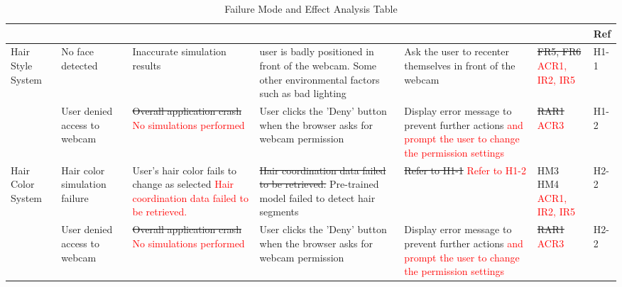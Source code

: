\documentclass{article}
\begin{document}
\begin{landscape}
\begin{table}[h!]
\def\arraystretch{1.7}
\begin{tabularx}{1.2\textwidth} { |X|X|X|X|X
  | p{0.9cm}
  | p{0.9cm} | }
\hline
	\centering{Component} & \centering{Failure Mode} & \centering{Effects of Failure} & \centering{Causes of Failure} & \centering{Recommended Action} & \centering{SR} & Ref \\ \hline
    Hair Style System & No face detected & Inaccurate simulation results & user is badly positioned in front of the webcam. Some other environmental factors such as bad lighting & Ask the user to recenter themselves in front of the webcam & \sout{FR5, FR6} \textcolor{red}{ACR1, IR2, IR5} & H1-1 \\ \cline{2-7}
     & User denied access to webcam & \sout{Overall application crash} \textcolor{red}{No simulations performed} & User clicks the 'Deny' button when the browser asks for webcam permission & Display error message to prevent further actions \textcolor{red}{and prompt the user to change the permission settings} & \sout{RAR1} \textcolor{red}{ACR3} & H1-2 \\ \hline
     
     Hair Color System  & Hair color simulation failure & User's hair color fails to change as selected 
     \newline \textcolor{red}{Hair coordination data failed to be retrieved.}&  
     \sout{Hair coordination data failed to be retrieved.} \newline 
     Pre-trained model failed to detect hair segments
     & \sout{Refer to H1-1} \textcolor{red}{Refer to H1-2}  & \sout{HM3 \newline HM4} \textcolor{red}{ACR1, IR2, IR5} & H2-2 \\ \cline{2-7}
     & User denied access to webcam & \sout{Overall application crash} \textcolor{red}{No simulations performed} & User clicks the 'Deny' button when the browser asks for webcam permission & Display error message to prevent further actions \textcolor{red}{and prompt the user to change the permission settings} & \sout{RAR1} \textcolor{red}{ACR3} & H2-2 \\ \hline
\end{tabularx}
\caption{Failure Mode and Effect Analysis Table}
\label{FMEA Table}
\end{table}
\end{landscape}

\newpage
\end{document}
